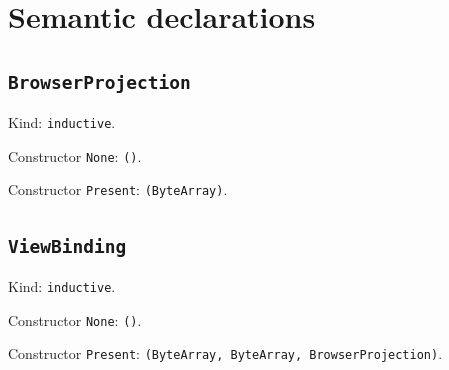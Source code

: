 \documentclass[11pt]{article}
\begin{document}
\section*{Semantic declarations}
\subsection*{\texttt{BrowserProjection}}
\noindent Kind: \texttt{inductive}.\par
\noindent Constructor \texttt{None}: \texttt{()}.\par
\noindent Constructor \texttt{Present}: \texttt{(ByteArray)}.\par
\subsection*{\texttt{ViewBinding}}
\noindent Kind: \texttt{inductive}.\par
\noindent Constructor \texttt{None}: \texttt{()}.\par
\noindent Constructor \texttt{Present}: \texttt{(ByteArray, ByteArray, BrowserProjection)}.\par
\end{document}
